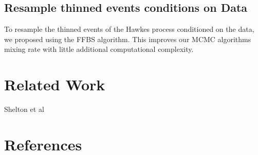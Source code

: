 \documentclass[11pt]{article}
\begin{document}
\subsection{Resample thinned events conditions on Data}

To resample the thinned events of the Hawkes process conditioned on the data, we proposed using the FFBS algorithm. This improves our MCMC algorithms mixing rate with little additional computational complexity.





\newpage
\section*{Related Work}

Shelton et al~\cite{AAAI1816985}


\newpage
\section*{References}


\end{document}
